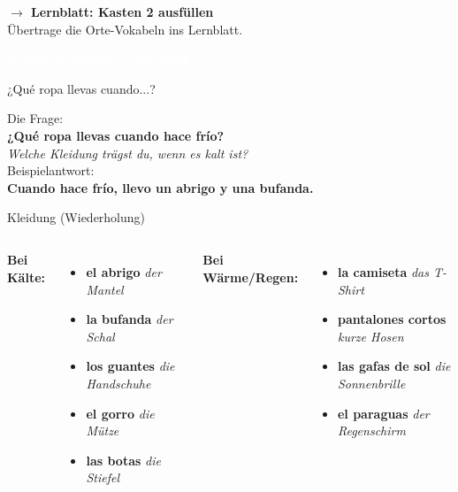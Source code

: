 \documentclass[aspectratio=169,11pt]{beamer}
\newcommand{\es}[1]{\textcolor{spanisch}{\textbf{#1}}}
\newcommand{\de}[1]{\textcolor{dunkelgrau}{\textit{#1}}}
\newcommand{\phase}[1]{\begin{center}\colorbox{spanisch}{\textcolor{white}{\large\bfseries #1}}\end{center}}
\begin{document}
\begin{frame}{}
\begin{center}
{\Large\bfseries $\rightarrow$ Lernblatt: Kasten 2 ausfüllen}\\[1cm]
{\normalsize Übertrage die Orte-Vokabeln ins Lernblatt.}
\end{center}
\end{frame}


\begin{frame}{}
\phase{Übung 3: Wetter + Kleidung}
\end{frame}

\begin{frame}{¿Qué ropa llevas cuando...?}
\begin{center}
{\Large Die Frage:}\\[0.5cm]
{\LARGE \es{¿Qué ropa llevas cuando hace frío?}}\\[0.3cm]
{\normalsize \de{Welche Kleidung trägst du, wenn es kalt ist?}}\\[1cm]
\pause
{\Large Beispielantwort:}\\[0.3cm]
{\Large \es{Cuando hace frío, llevo un abrigo y una bufanda.}}
\end{center}
\end{frame}

\begin{frame}{Kleidung (Wiederholung)}
\begin{columns}
\textbf{Bei Kälte:}
\begin{itemize}
\item \es{el abrigo} \de{der Mantel}
\item \es{la bufanda} \de{der Schal}
\item \es{los guantes} \de{die Handschuhe}
\item \es{el gorro} \de{die Mütze}
\item \es{las botas} \de{die Stiefel}
\end{itemize}

\textbf{Bei Wärme/Regen:}
\begin{itemize}
\item \es{la camiseta} \de{das T-Shirt}
\item \es{pantalones cortos} \de{kurze Hosen}
\item \es{las gafas de sol} \de{die Sonnenbrille}
\item \es{el paraguas} \de{der Regenschirm}
\end{itemize}
\end{columns}
\end{frame}
\end{document}
